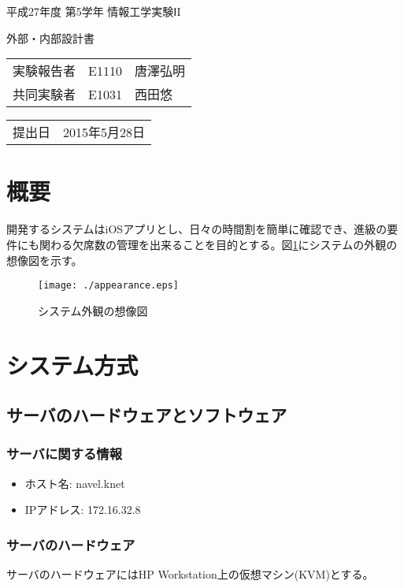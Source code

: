 \documentclass[a4paper,11pt]{jsarticle}
\begin{document}
平成27年度 第5学年 情報工学実験ⅠI

\vspace{0.5in}

\begin{center}
\Huge
外部・内部設計書

\vspace{2in}

\begin{table}[htbp]
\centering
\begin{tabular}{lll}
実験報告者 & E1110 & 唐澤弘明 \\
共同実験者 & E1031 & 西田悠 \\

\end{tabular}
\end{table}

\vspace{0.5in}

\begin{table}[htbp]
\centering
\begin{tabular}{ll}
提出日 & 2015年5月28日 \\
\end{tabular}
\end{table}
\end{center}


\setcounter{page}{0}
\thispagestyle{empty}
\newpage

\section{概要}
開発するシステムはiOSアプリとし、日々の時間割を簡単に確認でき、進級の要件にも関わる欠席数の管理を出来ることを目的とする。図\ref{img:appearance}にシステムの外観の想像図を示す。

\begin{figure}[htbp]
\centering
\texttt{[image: ./appearance.eps]}
\caption{システム外観の想像図 \label{img:appearance}}
\end{figure}


\section{システム方式}
\subsection{サーバのハードウェアとソフトウェア}
\subsubsection{サーバに関する情報}
\begin{itemize}
    \item ホスト名: navel.knet
    \item IPアドレス: 172.16.32.8
\end{itemize}

\subsubsection{サーバのハードウェア}
サーバのハードウェアにはHP Workstation上の仮想マシン(KVM)とする。
\end{document}
